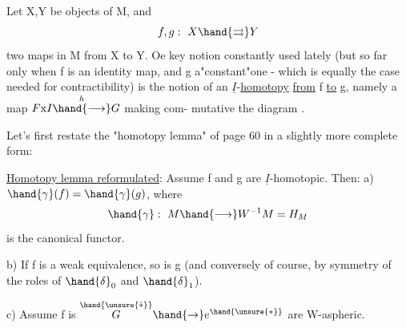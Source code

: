 Let X,Y be objects of M,  and 
\[ f,g:\ X\hand{\rightrightarrows} Y \]
two maps in M from X to Y. Oe key notion constantly used lately (but so
far only when f is an identity map,  and g a"constant"one  -  which is
equally the case needed for   contractibility) is the notion
of an $\underline{I}$-\uline{homotopy}  \uline{from} f \uline{to} g,  namely a map $F\mathrm{x}I\overset{h}{\hand{\longrightarrow}}G$  making com-%
mutative the diagram
 .

Let's first restate the "homotopy lemma" of page 60 in a slightly more
complete form:

\uline{Homotopy lemma reformulated}:  Assume f and g are $\underline{I}$-homotopic.  Then:
a) $\hand{\gamma}(f)=\hand{\gamma}(g)$,  where
\[ \hand{\gamma}:\ M\hand{\longrightarrow} W^{-1}M = H_{M} \]
is the canonical functor.

b) If  f  is a weak equivalence,  so is g  (and conversely of course,
by symmetry of the roles of $\hand{\delta}_0$ and $\hand{\delta}_1$).

c) Assume f is  
$\overset{\hand{\unsure{\hat{\ast}}}}{G}\hand{\rightarrow} e^{\hand{\unsure{\ast}}}$  are W-aspheric.

